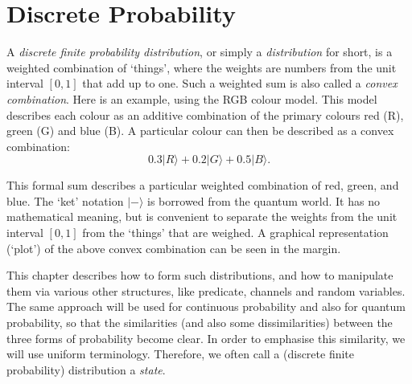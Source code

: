 \documentclass[leqno]{tufte-book} %
\newcommand{\ket}[1]{\ensuremath{|#1\rangle}}
\begin{document}
\chapter{Discrete Probability}\label{ch:dp}

A \emph{discrete finite probability distribution},
or simply a \emph{distribution} for short, is a weighted combination
of `things', where the weights are numbers from the unit interval
$[0,1]$ that add up to one. Such a weighted sum is also called a
\emph{convex combination}. Here is an
example, using the RGB colour model.  This model describes each colour
as an additive combination of the primary colours red (R), green (G)
and blue (B). A particular colour can then be described as a convex
combination:
$$0.3\ket{R} + 0.2\ket{G} + 0.5\ket{B}.$$

\noindent This formal sum describes a particular weighted combination
of red, green, and blue. The `ket' notation $\ket{-}$ is borrowed from
the quantum world. It has no mathematical meaning, but is convenient
to separate the weights from the unit interval $[0,1]$ from the
`things' that are weighed. A graphical representation (`plot') of the
above convex combination can be seen in the
margin.

This chapter describes how to form such distributions, and how to
manipulate them via various other structures, like predicate, channels
and random variables. The same approach will be used for continuous
probability and also for quantum probability, so that the similarities
(and also some dissimilarities) between the three forms of probability
become clear. In order to emphasise this similarity, we will use
uniform terminology. Therefore, we often call a (discrete finite
probability) distribution a \emph{state}.
\end{document}
